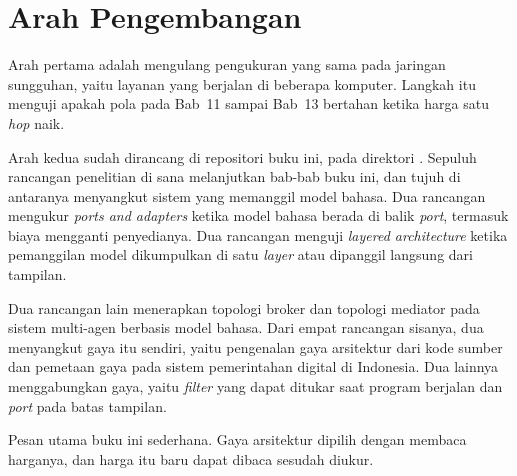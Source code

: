 \section*{Arah Pengembangan}

Arah pertama adalah mengulang pengukuran yang sama pada jaringan sungguhan,
yaitu layanan yang berjalan di beberapa komputer. Langkah itu menguji apakah
pola pada Bab~11 sampai Bab~13 bertahan ketika harga satu \textit{hop} naik.

Arah kedua sudah dirancang di repositori buku ini, pada direktori
. Sepuluh rancangan penelitian di sana melanjutkan bab-bab buku
ini, dan tujuh di antaranya menyangkut sistem yang memanggil model bahasa. Dua
rancangan mengukur
\textit{ports and adapters} ketika model bahasa berada di balik \textit{port},
termasuk biaya mengganti penyedianya. Dua rancangan menguji \textit{layered
architecture} ketika pemanggilan model dikumpulkan di satu \textit{layer} atau
dipanggil langsung dari tampilan.

Dua rancangan lain menerapkan topologi broker dan topologi mediator pada sistem
multi-agen berbasis model bahasa. Dari empat rancangan sisanya, dua menyangkut
gaya itu sendiri, yaitu pengenalan gaya arsitektur dari kode sumber dan pemetaan
gaya pada sistem pemerintahan digital di Indonesia. Dua lainnya menggabungkan
gaya, yaitu \textit{filter} yang dapat ditukar saat program berjalan dan
\textit{port} pada batas tampilan.

Pesan utama buku ini sederhana. Gaya arsitektur dipilih dengan membaca harganya,
dan harga itu baru dapat dibaca sesudah diukur.
